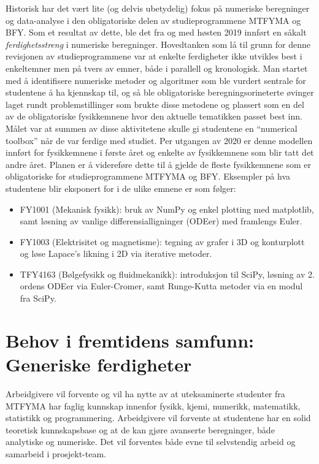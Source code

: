 \documentclass{article}
\begin{document}
Historisk har det vært lite (og delvis ubetydelig) fokus på numeriske beregninger og data-analyse i den obligatoriske delen av studieprogrammene MTFYMA og BFY. Som et resultat av dette, ble det fra og med høsten 2019 innført en såkalt \emph{ferdighetsstreng} i numeriske beregninger. Hovedtanken som lå til grunn for denne revisjonen av studieprogrammene var at enkelte ferdigheter ikke utvikles best i enkeltemner men på tvers av emner, både i parallell og kronologisk. Man startet med å identifisere numeriske metoder og algoritmer som ble vurdert sentrale for studentene å ha kjennskap til, og så ble obligatoriske beregningsorineterte øvinger laget rundt problemstillinger som brukte disse metodene og plassert som en del av de obligatoriske fysikkemnene hvor den aktuelle tematikken passet best inn. Målet var at summen av disse aktivitetene skulle gi studentene en ``numerical toolbox'' når de var ferdige med studiet. Per utgangen av 2020 er denne modellen innført for fysikkemnene i første året og enkelte av fysikkemnene som blir tatt det andre året. Planen er å videreføre dette til å gjelde de fleste fysikkemnene som er obligatoriske for studieprogrammene MTFYMA og BFY. Eksempler på hva studentene blir eksponert for i de ulike emnene er som følger:
\begin{itemize}
  \item FY1001 (Mekanisk fysikk): bruk av NumPy og enkel plotting med matplotlib, samt løsning av vanlige differensialligninger (ODEer) med framlengs Euler.
  \item FY1003 (Elektrisitet og magnetisme): tegning av grafer i 3D og konturplott og løse Lapace's likning i 2D via iterative metoder.
  \item TFY4163 (Bølgefysikk og fluidmekanikk): introduksjon til SciPy, løsning av 2. ordens ODEer via Euler-Cromer, samt Runge-Kutta metoder via en modul fra SciPy.
\end{itemize}

\section{Behov i fremtidens samfunn: Generiske ferdigheter}
\label{sec:behov}
Arbeidgivere vil forvente og vil ha nytte av at uteksaminerte studenter fra MTFYMA har faglig kunnskap innenfor fysikk, kjemi, numerikk, matematikk, statistikk og programmering.
Arbeidgivere vil forvente at studentene har en solid teoretisk kunnskapsbase og at de kan gjøre avanserte beregninger, både analytiske og numeriske.
Det vil forventes både evne til selvstendig arbeid og samarbeid i prosjekt-team.
\end{document}
